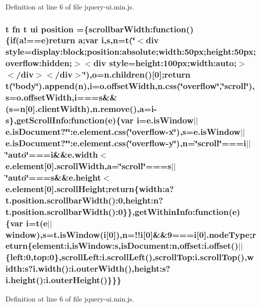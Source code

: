 {{Definition at line 6 of file jquery-\/ui.\+min.\+js.

\subsubsection[{\texorpdfstring{position}{position}}]{ {\bf t} {\bf fn} {\bf t} {\bf ui} position =\{scrollbar\+Width\+:function()\{{\bf if}(a!=={\bf e})return {\bf a};var {\bf i},{\bf s},{\bf n}={\bf t}(\char`\"{}$<$div style=\textquotesingle{}display\+:block;position\+:absolute;width\+:50px;height\+:50px;overflow\+:hidden;\textquotesingle{}$>$$<$div style=\textquotesingle{}height\+:100px;width\+:auto;\textquotesingle{}$>$$<$/div$>$$<$/div$>$\char`\"{}),o=n.\+children()\mbox{[}0\mbox{]};return {\bf t}(\char`\"{}body\char`\"{}).append({\bf n}),{\bf i}=o.\+offset\+Width,n.\+css(\char`\"{}overflow\char`\"{},\char`\"{}scroll\char`\"{}),s=o.\+offset\+Width,{\bf i}==={\bf s}\&\&({\bf s}={\bf n}\mbox{[}0\mbox{]}.client\+Width),{\bf n.\+remove}(),{\bf a}={\bf i}-\/{\bf s}\},get\+Scroll\+Info\+:function({\bf e})\{var {\bf i}=e.\+is\+Window$\vert$$\vert$e.\+is\+Document?\char`\"{}\char`\"{}\+:e.\+element.\+css(\char`\"{}overflow-\/{\bf x}\char`\"{}),s=e.\+is\+Window$\vert$$\vert$e.\+is\+Document?\char`\"{}\char`\"{}\+:e.\+element.\+css(\char`\"{}overflow-\/{\bf y}\char`\"{}),n=\char`\"{}scroll\char`\"{}===i$\vert$$\vert$\char`\"{}auto\char`\"{}===i\&\&e.\+width$<$e.\+element\mbox{[}0\mbox{]}.scroll\+Width,{\bf a}=\char`\"{}scroll\char`\"{}===s$\vert$$\vert$\char`\"{}auto\char`\"{}===s\&\&{\bf e.\+height}$<$e.\+element\mbox{[}0\mbox{]}.scroll\+Height;return\{width\+:a?t.\+position.\+scrollbar\+Width()\+:0,height\+:n?t.\+position.\+scrollbar\+Width()\+:0\}\},get\+Within\+Info\+:function({\bf e})\{var {\bf i}={\bf t}({\bf e}$\vert$$\vert$window),{\bf s}=t.\+is\+Window({\bf i}\mbox{[}0\mbox{]}),{\bf n}=!!{\bf i}\mbox{[}0\mbox{]}\&\&9==={\bf i}\mbox{[}0\mbox{]}.node\+Type;return\{element\+:i,is\+Window\+:s,is\+Document\+:n,offset\+:i.\+offset()$\vert$$\vert$\{left\+:0,top\+:0\},scroll\+Left\+:i.\+scroll\+Left(),scroll\+Top\+:i.\+scroll\+Top(),width\+:s?i.\+width()\+:i.\+outer\+Width(),height\+:s?{\bf i.\+height}()\+:i.\+outer\+Height()\}\}\}}\hypertarget{jquery-ui_8min_8js_a46cd3bf7f3b19525671d8317c10bdc49}{}\label{jquery-ui_8min_8js_a46cd3bf7f3b19525671d8317c10bdc49}


Definition at line 6 of file jquery-\/ui.\+min.\+js.

}}
